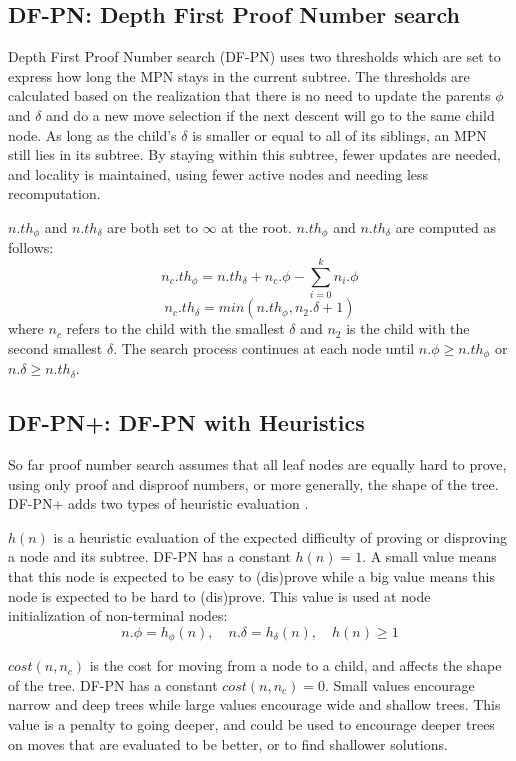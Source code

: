 \subsection{DF-PN: Depth First Proof Number search} \label{sec:DF-PN}

Depth First Proof Number search (DF-PN)\cite{nagai1999-DFPN} uses two thresholds which are set to express how long the MPN stays in the current subtree. The thresholds are calculated based on the realization that there is no need to update the parents $\phi$ and $\delta$ and do a new move selection if the next descent will go to the same child node. As long as the child's $\delta$ is smaller or equal to all of its siblings, an MPN still lies in its subtree. By staying within this subtree, fewer updates are needed, and locality is maintained, using fewer active nodes and needing less recomputation.

$n.th_\phi$ and $n.th_\delta$ are both set to $\infty$ at the root. $n.th_\phi$ and $n.th_\delta$ are computed as follows: $$n_c.th_\phi = n.th_\delta + n_c.\phi - \displaystyle\sum\limits_{i=0}^k n_i. \phi$$ $$n_c.th_\delta = min(n.th_\phi, n_2.\delta + 1)$$ where $n_c$ refers to the child with the smallest $\delta$ and $n_2$ is the child with the second smallest $\delta$. The search process continues at each node until $n.\phi \geq n.th_\phi$ or $n.\delta \geq n.th_\delta$.


\subsection{DF-PN+: DF-PN with Heuristics} \label{sec:DF-PN+}

So far proof number search assumes that all leaf nodes are equally hard to prove, using only proof and disproof numbers, or more generally, the shape of the tree. DF-PN+ adds two types of heuristic evaluation \cite{nagai-thesis}.

$h(n)$ is a heuristic evaluation of the expected difficulty of proving or disproving a node and its subtree. DF-PN has a constant $h(n) = 1$. A small value means that this node is expected to be easy to (dis)prove while a big value means this node is expected to be hard to (dis)prove. This value is used at node initialization of non-terminal nodes: $$n.\phi = h_\phi(n), \quad n.\delta = h_\delta(n), \quad h(n) \ge 1$$

$cost(n, n_c)$ is the cost for moving from a node to a child, and affects the shape of the tree. DF-PN has a constant $cost(n, n_c) = 0$. Small values encourage narrow and deep trees while large values encourage wide and shallow trees. This value is a penalty to going deeper, and could be used to encourage deeper trees on moves that are evaluated to be better, or to find shallower solutions.

